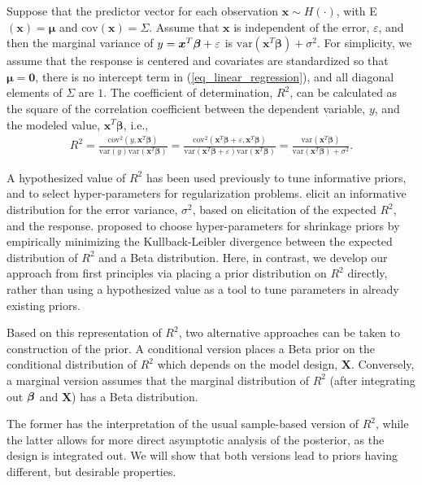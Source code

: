 \documentclass[12pt]{article}
\newcommand{\X}{{\bm  X}}
\newcommand{\xbf}{{\bm x}}
\newcommand{\greekbold}[1]{\mbox{\boldmath $#1$}}
\newcommand{\betabf}{\greekbold{\beta}}
\newcommand{\R}{{R^2}}
\begin{document}
Suppose that  the predictor vector for each observation $ \bm{x} \sim H(\cdot)$,    with E$(  \bm{x}) =  \bm{\mu}$  and $\text{cov}( \bm{x}) = \Sigma$.
%
Assume  that $ \bm{x}$ is  independent of the   error, $ \varepsilon$,  and      then the marginal  variance of  $y=\xbf^T\betabf+\varepsilon$ is $\text{var}( \bm{x}^T \bm{\beta})+\sigma^2$.
For simplicity,  we  assume that the response is centered and  covariates are standardized so that $\bm{\mu} = \bm{0}$,  there is no intercept term in (\ref{eq_linear_regression}), and    all diagonal elements of $\Sigma$ are $1$.
The coefficient of determination,  $R^2$,    can be calculated as the square of the correlation coefficient between the  dependent variable, $y$,   and  the modeled  value, $ \bm{x}^T \bm{\beta}$, i.e.,
\begin{eqnarray} \label{eq_rsquare}
	R^2 = \frac{\text{cov}^2(y, \bm{x}^T \bm{\beta})}{ \text{var}(y)\text{var}( \bm{x}^T \bm{\beta})}
	= \frac{\text{cov}^2( \bm{x}^T \bm{\beta}+\varepsilon, \bm{x}^T \bm{\beta})}{ \text{var}( \bm{x}^T \bm{\beta}+\varepsilon)\text{var}( \bm{x}^T \bm{\beta})}
	=  \frac{\text{var}({ \bm{x}}^T\bm{\beta})}{\text{var}({\bm  x}^T \bm\beta) + \sigma^2} .
\end{eqnarray}

A hypothesized value of $\R$ has been used previously to tune informative priors, and to select hyper-parameters for regularization problems.
\cite{scott2014predicting} elicit an informative distribution for the error variance, $\sigma^2$, based on elicitation of the expected $\R$, and the response.
\cite{zhang2018variable} proposed to choose hyper-parameters for shrinkage priors by empirically minimizing the Kullback-Leibler divergence between the expected distribution of $\R$ and a Beta distribution. Here, in contrast, we develop our approach from first principles via placing a prior distribution on $\R$ directly, rather than using a hypothesized value as a tool to tune parameters in already existing priors.

Based on this representation of $R^2$, two alternative approaches can be taken to construction of the prior. A conditional version places a Beta prior on the conditional distribution of $\R$ which depends on the model design, $\X$. Conversely, a marginal version assumes that the marginal distribution of $\R$ (after integrating out $\betabf$ and $\X$) has a Beta distribution.

The former has the interpretation of the usual sample-based version of $\R$, while the latter allows for more direct asymptotic analysis of the posterior, as the design is integrated out. We will show that both versions lead to priors having different, but desirable properties.
\end{document}
